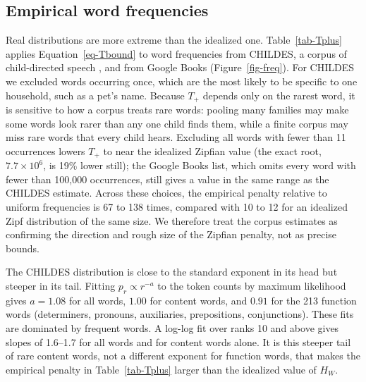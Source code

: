 \documentclass[a4paper,natbib,man]{apa6}
\begin{document}
\subsection{Empirical word frequencies}
Real distributions are more extreme than the idealized one. Table~\ref{tab-Tplus} applies Equation~\ref{eq-Tbound} to word frequencies from CHILDES, a corpus of child-directed speech \citep{MacWhinney1990}, and from Google Books \citep{Michel:2011} (Figure~\ref{fig-freq}). For CHILDES we excluded words occurring once, which are the most likely to be specific to one household, such as a pet's name. Because $T_+$ depends only on the rarest word, it is sensitive to how a corpus treats rare words: pooling many families may make some words look rarer than any one child finds them, while a finite corpus may miss rare words that every child hears. Excluding all words with fewer than 11 occurrences lowers $T_+$ to near the idealized Zipfian value (the exact root, $7.7 \times 10^6$, is 19\% lower still); the Google Books list, which omits every word with fewer than 100,000 occurrences, still gives a value in the same range as the CHILDES estimate. Across these choices, the empirical penalty relative to uniform frequencies is 67 to 138 times, compared with 10 to 12 for an idealized Zipf distribution of the same size. We therefore treat the corpus estimates as confirming the direction and rough size of the Zipfian penalty, not as precise bounds.

The CHILDES distribution is close to the standard exponent in its head but steeper in its tail. Fitting $p_r \propto r^{-a}$ to the token counts by maximum likelihood gives $a = 1.08$ for all words, $1.00$ for content words, and $0.91$ for the 213 function words (determiners, pronouns, auxiliaries, prepositions, conjunctions). These fits are dominated by frequent words. A log-log fit over ranks 10 and above gives slopes of 1.6--1.7 for all words and for content words alone. It is this steeper tail of rare content words, not a different exponent for function words, that makes the empirical penalty in Table~\ref{tab-Tplus} larger than the idealized value of $H_W$.
\end{document}
